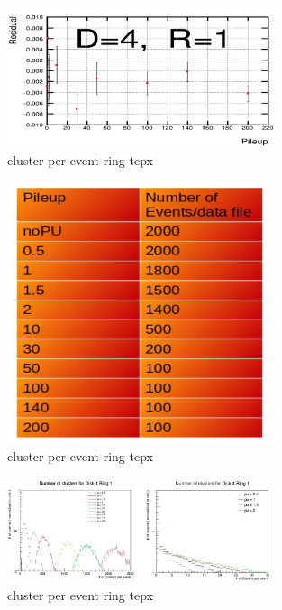 \begin{figure}[!htp]
\centering
\includegraphics[width=0.7\textwidth]{ashish_thesis/twofold_residual_D4R1.png}
\caption{%
  cluster per event ring tepx 
}
\label{fig:cluster_ring}
\end{figure}


\begin{figure}[!htp]
\centering
\includegraphics[width=0.7\textwidth]{ashish_thesis/events_per_file_tepx_sim.png}
\caption{%
  cluster per event ring tepx 
}
\label{fig:cluster_ring}
\end{figure}


\begin{figure}[!htp]
\centering
\includegraphics[width=0.7\textwidth]{ashish_thesis/clusters_D4R1_low_allPU.png}
\caption{%
  cluster per event ring tepx 
}
\label{fig:cluster_ring}
\end{figure}



